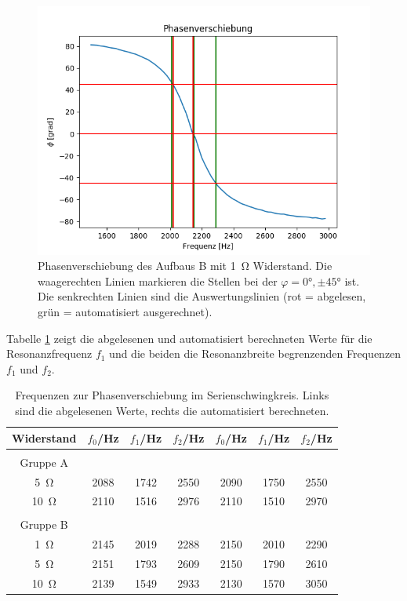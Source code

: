 \documentclass[12pt,a4paper]{article}
\begin{document}
\begin{figure}
	\centering
	\includegraphics[scale=0.8]{Bilder/Serie_Phasenverschiebung_B_1.png}
	\caption{Phasenverschiebung des Aufbaus B mit \SI{1}{\ohm} Widerstand. Die waagerechten Linien markieren die Stellen bei der $\varphi = \ang{0}, \pm \ang{45}$ ist. Die senkrechten Linien sind die Auswertungslinien (rot = abgelesen, grün = automatisiert ausgerechnet).}
	\label{fig:Serie_Phasenverschiebung_B_1}
\end{figure}



Tabelle \ref{tab:StromPhasenverschiebung} zeigt die abgelesenen und automatisiert berechneten Werte für die Resonanzfrequenz $f_1$ und die beiden die Resonanzbreite begrenzenden Frequenzen $f_1$ und $f_2$.


\begin{table}
	\centering
	\begin{tabular}{|c|c|c|c||c|c|c|}
		\hline
		Widerstand & $f_0$/Hz & $f_1$/Hz & $f_2$/Hz & $f_0$/Hz & $f_1$/Hz & $f_2$/Hz \\
		\hline
		&&&&&&\\
		Gruppe A &&&&&&  \\
		\hline
		\SI{5}{\ohm} & 2088 & 1742 & 2550 & 2090 & 1750 & 2550 \\
		\hline
		\SI{10}{\ohm} & 2110 & 1516 & 2976 & 2110 & 1510 & 2970 \\
		\hline
		&&&&&&\\
		Gruppe B &&&&&&\\
		\hline
		\SI{1}{\ohm} & 2145 & 2019 & 2288 & 2150 & 2010 & 2290 \\
		\hline
		\SI{5}{\ohm} & 2151 & 1793 & 2609 & 2150 & 1790 & 2610 \\
		\hline
		\SI{10}{\ohm} & 2139 & 1549 & 2933 & 2130 & 1570 & 3050 \\
		\hline
	\end{tabular}
	\caption{Frequenzen zur Phasenverschiebung im Serienschwingkreis. Links sind die abgelesenen Werte, rechts die automatisiert berechneten.}
	\label{tab:StromPhasenverschiebung}
\end{table}
\end{document}
